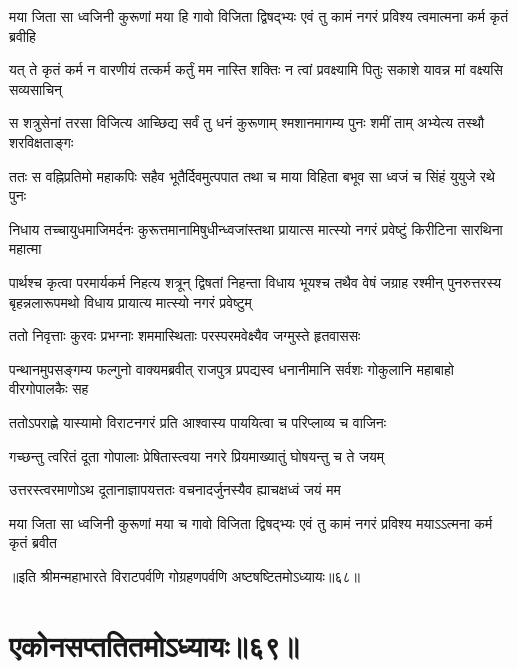 \fourlineindentedshloka
{मया जिता सा ध्वजिनी कुरूणां}
{मया हि गावो विजिता द्विषद्भ्यः}
{एवं तु कामं नगरं प्रविश्य}
{त्वमात्मना कर्म कृतं ब्रवीहि}




\fourlineindentedshloka
{यत् ते कृतं कर्म न वारणीयं}
{तत्कर्म कर्तुं मम नास्ति शक्तिः}
{न त्वां प्रवक्ष्यामि पितुः सकाशे}
{यावन्न मां वक्ष्यसि सव्यसाचिन्}




\fourlineindentedshloka
{स शत्रुसेनां तरसा विजित्य}
{आच्छिद्य सर्वं तु धनं कुरूणाम्}
{श्मशानमागम्य पुनः शमीं ताम्}
{अभ्येत्य तस्थौ शरविक्षताङ्गः}


\fourlineindentedshloka
{ततः स वह्निप्रतिमो महाकपिः}
{सहैव भूतैर्दिवमुत्पपात}
{तथा च माया विहिता बभूव सा}
{ध्वजं च सिंहं युयुजे रथे पुनः}


\fourlineindentedshloka
{निधाय तच्चायुधमाजिमर्दनः}
{कुरूत्तमानामिषुधीन्ध्वजांस्तथा}
{प्रायात्स मात्स्यो नगरं प्रवेष्टुं}
{किरीटिना सारथिना महात्मा}


\sixlineindentedshloka
{पार्थश्च कृत्वा परमार्यकर्म}
{निहत्य शत्रून् द्विषतां निहन्ता}
{विधाय भूयश्च तथैव वेषं}
{जग्राह रश्मीन् पुनरुत्तरस्य}
{बृहन्नलारूपमथो विधाय}
{प्रायात्य मात्स्यो नगरं प्रवेष्टुम्}



\twolineshloka
{ततो निवृत्ताः कुरवः प्रभग्नाः शममास्थिताः}
{परस्परमवेक्ष्यैव जग्मुस्ते हृतवाससः}


\threelineshloka
{पन्थानमुपसङ्गम्य फल्गुनो वाक्यमब्रवीत्}
{राजपुत्र प्रपद्यस्व धनानीमानि सर्वशः}
{गोकुलानि महाबाहो वीरगोपालकैः सह}


\twolineshloka
{ततोऽपराह्णे यास्यामो विराटनगरं प्रति}
{आश्वास्य पाययित्वा च परिप्लाव्य च वाजिनः}



\twolineshloka
{गच्छन्तु त्वरितं दूता गोपालाः प्रेषितास्त्वया}
{नगरे प्रियमाख्यातुं घोषयन्तु च ते जयम्}


\twolineshloka
{उत्तरस्त्वरमाणोऽथ दूतानाज्ञापयत्ततः}
{वचनादर्जुनस्यैव ह्याचक्षध्वं जयं मम}


\fourlineindentedshloka
{मया जिता सा ध्वजिनी कुरूणां}
{मया च गावो विजिता द्विषद्भ्यः}
{एवं तु कामं नगरं प्रविश्य}
{मयाऽऽत्मना कर्म कृतं ब्रवीत}

॥इति श्रीमन्महाभारते विराटपर्वणि गोग्रहणपर्वणि अष्टषष्टितमोऽध्यायः॥६८॥

\chapter{एकोनसप्ततितमोऽध्यायः॥६९॥}

